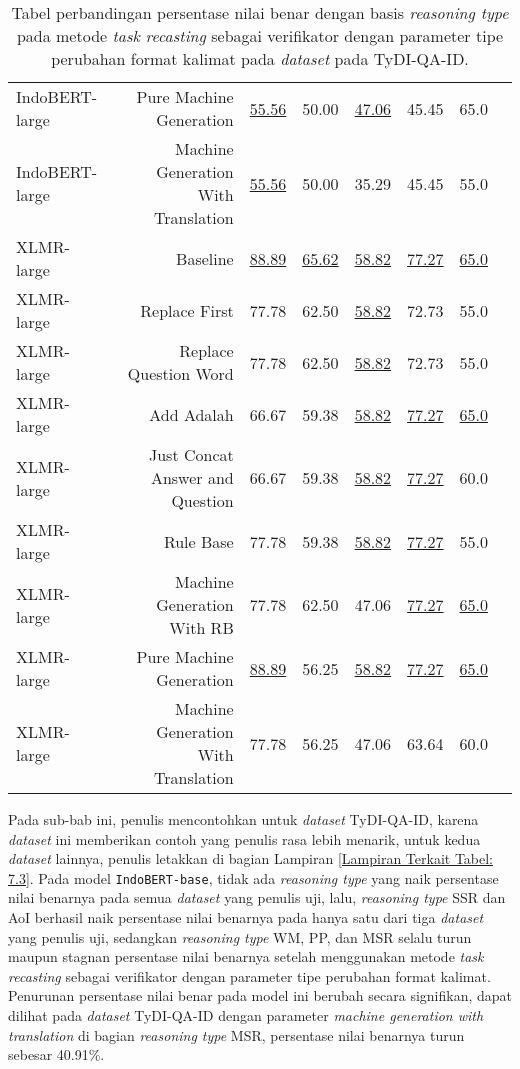 \begin{table}[H]
\begin{tabular}{lrrrrrrr}
IndoBERT-large &Pure Machine Generation &\underline{55.56} &50.00 &\underline{47.06} &45.45 &65.0 \\
IndoBERT-large &Machine Generation With Translation &\underline{55.56} &50.00 &35.29 &45.45 &55.0 \\
\hline
XLMR-large &Baseline &\underline{88.89} &\underline{65.62} &\underline{58.82} &\underline{77.27} &\underline{65.0} \\
XLMR-large &Replace First &77.78 &62.50 &\underline{58.82} &72.73 &55.0 \\
XLMR-large &Replace Question Word &77.78 &62.50 &\underline{58.82} &72.73 &55.0 \\
XLMR-large &Add Adalah &66.67 &59.38 &\underline{58.82} &\underline{77.27} &\underline{65.0} \\
XLMR-large &Just Concat Answer and Question &66.67 &59.38 &\underline{58.82} &\underline{77.27} &60.0 \\
XLMR-large &Rule Base &77.78 &59.38 &\underline{58.82} &\underline{77.27} &55.0 \\
XLMR-large &Machine Generation With RB &77.78 &62.50 &47.06 &\underline{77.27} &\underline{65.0} \\
XLMR-large &Pure Machine Generation &\underline{88.89} &56.25 &\underline{58.82} &\underline{77.27} &\underline{65.0} \\
XLMR-large &Machine Generation With Translation &77.78 &56.25 &47.06 &63.64 &60.0 \\
\bottomrule
\end{tabular}
\caption{Tabel perbandingan persentase nilai benar dengan basis \emph{reasoning type} pada metode \emph{task recasting} sebagai verifikator dengan parameter tipe perubahan format kalimat pada \emph{dataset} pada TyDI-QA-ID.}
\end{table}

Pada sub-bab ini, penulis mencontohkan untuk \emph{dataset} TyDI-QA-ID, karena \emph{dataset} ini memberikan contoh yang penulis rasa lebih menarik, untuk kedua \emph{dataset} lainnya, penulis letakkan di bagian Lampiran \ref{Lampiran Terkait Tabel: 7.3}. Pada model \texttt{IndoBERT-base}, tidak ada \emph{reasoning type} yang naik persentase nilai benarnya pada semua \emph{dataset} yang penulis uji, lalu, \emph{reasoning type} SSR dan AoI berhasil naik persentase nilai benarnya pada hanya satu dari tiga \emph{dataset} yang penulis uji, sedangkan \emph{reasoning type} WM, PP, dan MSR selalu turun maupun stagnan persentase nilai benarnya setelah menggunakan metode \emph{task recasting} sebagai verifikator dengan parameter tipe perubahan format kalimat. Penurunan persentase nilai benar pada model ini berubah secara signifikan, dapat dilihat pada \emph{dataset} TyDI-QA-ID  dengan parameter \emph{machine generation with translation} di bagian \emph{reasoning type} MSR, persentase nilai benarnya turun sebesar 40.91\%.

